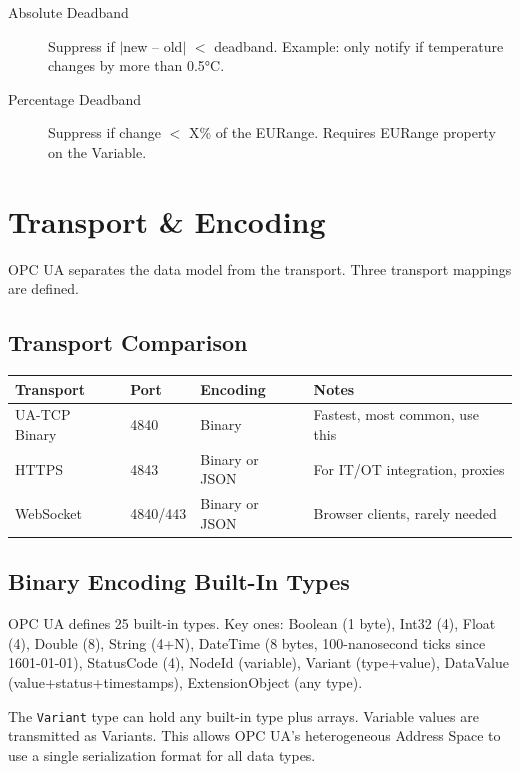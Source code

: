 \documentclass[12pt,twoside,openright]{memoir}
\begin{document}
\begin{description}
  \item[Absolute Deadband] Suppress if $|$new -- old$|$ $<$ deadband. Example: only notify if temperature changes by more than 0.5°C.
  \item[Percentage Deadband] Suppress if change $<$ X\% of the EURange. Requires EURange property on the Variable.
\end{description}

\chapter{Transport \& Encoding}

OPC UA separates the data model from the transport. Three transport mappings are defined.

\section{Transport Comparison}

\begin{tabularx}{\textwidth}{lllX}
\toprule
\textbf{Transport} & \textbf{Port} & \textbf{Encoding} & \textbf{Notes} \\
\midrule
\rowcolor{rowlight} UA-TCP Binary & 4840 & Binary & Fastest, most common, use this \\
HTTPS & 4843 & Binary or JSON & For IT/OT integration, proxies \\
\rowcolor{rowlight} WebSocket & 4840/443 & Binary or JSON & Browser clients, rarely needed \\
\bottomrule
\end{tabularx}

\section{Binary Encoding Built-In Types}

OPC UA defines 25 built-in types. Key ones: Boolean (1 byte), Int32 (4), Float (4), Double (8), String (4+N),
DateTime (8 bytes, 100-nanosecond ticks since 1601-01-01), StatusCode (4), NodeId (variable), Variant (type+value),
DataValue (value+status+timestamps), ExtensionObject (any type).

\begin{protip}
The \texttt{Variant} type can hold any built-in type plus arrays. Variable values are transmitted as Variants.
This allows OPC UA's heterogeneous Address Space to use a single serialization format for all data types.
\end{protip}
\end{document}
